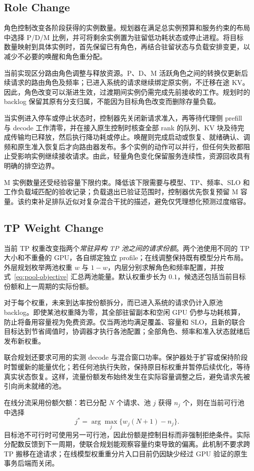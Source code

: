 \subsection{Role Change}
角色控制改变各阶段获得的实例数量。规划器在满足总实例预算和服务约束的布局中选择 P/D/M 比例，并可将剩余实例置为驻留低功耗状态或停止进程。将目标数量映射到具体实例时，首先保留已有角色，再结合驻留状态与负载安排变更，以减少不必要的唤醒和角色重分配。

当前实现区分路由角色调整与释放资源。P、D、M 活跃角色之间的转换仅更新后续请求的路由角色及频率；已进入系统的请求继续绑定原实例，不迁移在途 KV。因此，角色改变可以渐进生效，过渡期间实例仍需完成先前接收的工作。规划时的 backlog 保留其原有分支归属，不能因为目标角色改变而删除存量负载。

当实例进入停车或停止状态时，控制器先关闭新请求准入，再等待代理侧 prefill 与 decode 工作清零，并在接入原生控制时核查全部 rank 的队列、KV 块及待完成传输均已释放，然后执行降功耗或停止。唤醒则完成启动或恢复、就绪确认、调频和原生准入恢复后才向路由器发布。多个实例的动作可以并行，但任何失败都阻止受影响实例继续接收请求。由此，轻量角色变化保留服务连续性，资源回收具有明确的排空边界。

M 实例数量还受经验容量下限约束。降低该下限需要与模型、TP、频率、SLO 和工作负载域匹配的验收记录；负载退出已验证范围时，控制器优先恢复预留 M 容量。该约束补足排队近似对复杂混合干扰的描述，避免仅凭理想化预测过度缩容。

\subsection{TP Weight Change}
当前 TP 权重改变指两个\emph{常驻异构 TP 池之间的请求份额}。两个池使用不同的 TP 大小和不重叠的 GPU，各自绑定独立 profile；在线调整保持既有模型分片布局。外层规划枚举两池权重 $w$ 与 $1-w$，内层分别求解角色和频率配置，并按式~\eqref{eq:pool-objective} 汇总两池能量。默认权重步长为 $0.1$，候选还包括当前目标份额和上一周期的实际份额。

对于每个权重，未来到达率按份额拆分，而已进入系统的请求仍计入原池 backlog。即使某池权重降为零，其全部驻留副本和空闲 GPU 仍参与功耗核算，防止将备用容量视为免费资源。仅当两池均满足覆盖、容量和 SLO，且新的联合目标达到节省阈值时，协调器才执行各池配置；全部角色、频率和准入状态就绪后发布新权重。

联合规划还要求可用的实测 decode 与混合窗口功率。保护器处于扩容或保持阶段时暂缓新的能量优化；若任何池执行失败，保持原目标权重并暂停后续优化，等待真实状态恢复。这样，流量份额发布始终发生在实际容量调整之后，避免请求先被引向尚未就绪的池。

在线分流采用份额欠额：若已分配 $N$ 个请求、池 $j$ 获得 $n_j$ 个，则在当前可行池中选择
\begin{equation}
 j^*=\arg\max_j\{w_j(N+1)-n_j\}.
\end{equation}
目标池不可行时可使用另一可行池，因此份额是控制目标而非强制拒绝条件。实际分配数反馈到下一周期，使联合规划能观察容量约束导致的偏离。此机制不要求跨 TP 搬移在途请求；在线模型权重重分片入口目前仍因缺少经过 GPU 验证的原生事务后端而关闭。
